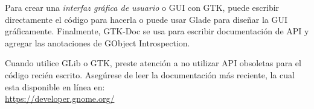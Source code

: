 Para crear una \emph{interfaz gráfica de usuario} o GUI con GTK, puede escribir directamente el código para hacerla o puede usar Glade para diseñar la GUI gráficamente. Finalmente, GTK-Doc se usa para escribir documentación de API y agregar las anotaciones de GObject Introspection.

Cuando utilice GLib o GTK, preste atención a no utilizar API obsoletas para el código recién escrito. Asegúrese de leer la documentación más reciente, la cual esta disponible en línea en:\\

\url{https://developer.gnome.org/}
